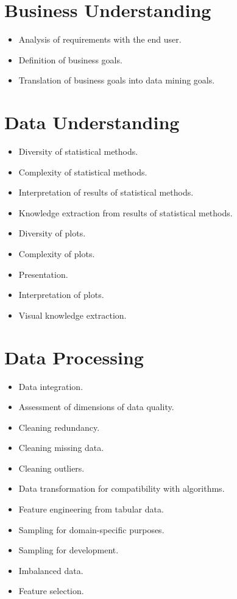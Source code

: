 \documentclass[a4paper,12pt]{report}
\begin{document}
\chapter{Business Understanding}

\begin{itemize}
    \item Analysis of requirements with the end user.
    \item Definition of business goals.
    \item Translation of business goals into data mining goals.
\end{itemize}




\chapter{Data Understanding}

\begin{itemize}
    \item Diversity of statistical methods.
	\item Complexity of statistical methods.
	\item Interpretation of results of statistical methods.
	\item Knowledge extraction from results of statistical methods.
	\item Diversity of plots.
	\item Complexity of plots.
	\item Presentation.
	\item Interpretation of plots.
	\item Visual knowledge extraction.
\end{itemize}



\chapter{Data Processing}

\begin{itemize}
    \item Data integration.
    \item Assessment of dimensions of data quality.
    \item Cleaning redundancy.
    \item Cleaning missing data.
    \item Cleaning outliers.
    \item Data transformation for compatibility with algorithms.
    \item Feature engineering from tabular data.
    \item Sampling for domain-specific purposes.
    \item Sampling for development.
    \item Imbalanced data.
    \item Feature selection.
\end{itemize}
\end{document}
